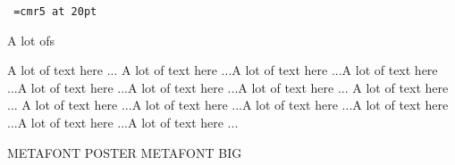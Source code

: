 \documentclass[a4paper]{report}
\begin{document}
	\pagestyle{empty}
	\tt       %
	\font\tinyfont=cmr5 at 20pt

	\scriptsize


\begin{multicols}{1}

A lot ofs

\vfill
\columnbreak

A lot of text here ... A lot of text here ...A lot of text here ...A lot of text here ...A lot of text here ...A lot of text here ...A lot of text here ...
A lot of text here ... A lot of text here ...A lot of text here ...A lot of text here ...A lot of text here ...A lot of text here ...A lot of text here ...


\end{multicols}

		
		\noindent
		\vspace{.5cm}
\hrulefill
\vspace{2cm}


\noindent 
 \begin{center}
METAFONT POSTER
\tinyfont
METAFONT BIG
\end{center}
\end{document}

